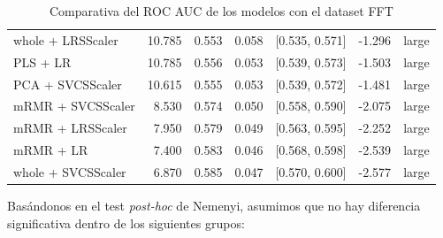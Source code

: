 \documentclass[a4paper,oneside,11pt,leqno]{article}
\begin{document}
\begin{table}[h]
\begin{tabular}{lrrrlll}
			whole + LRSScaler  & 10.785 & 0.553 & 0.058 &  [0.535, 0.571] & -1.296 &       large \\
			PLS + LR           & 10.785 & 0.556 & 0.053 &  [0.539, 0.573] & -1.503 &       large \\
			PCA + SVCSScaler   & 10.615 & 0.555 & 0.053 &  [0.539, 0.572] & -1.481 &       large \\
			mRMR + SVCSScaler  &  8.530 & 0.574 & 0.050 &  [0.558, 0.590] & -2.075 &       large \\
			mRMR + LRSScaler   &  7.950 & 0.579 & 0.049 &  [0.563, 0.595] & -2.252 &       large \\
			mRMR + LR          &  7.400 & 0.583 & 0.046 &  [0.568, 0.598] & -2.539 &       large \\
			whole + SVCSScaler &  6.870 & 0.585 & 0.047 &  [0.570, 0.600] & -2.577 &       large \\
			\bottomrule
		\end{tabular}
		\caption{Comparativa del ROC AUC de los modelos con el dataset FFT}
		\label{tab:stat_results_fft}
	\end{table}

	Basándonos en el test \textit{post-hoc} de Nemenyi, asumimos que no hay diferencia significativa dentro de los siguientes grupos:
\end{document}
